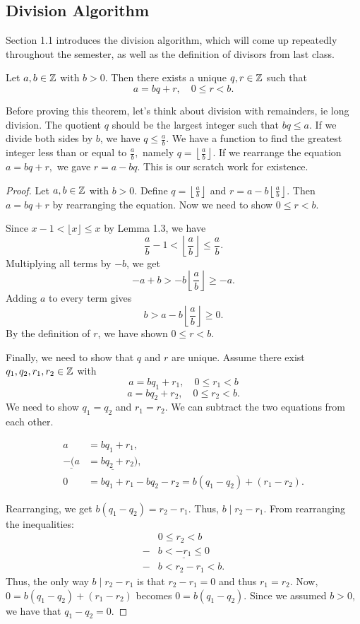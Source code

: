 \documentclass{ximera}
\begin{document}
\subsection{Division Algorithm}
Section 1.1 introduces the division algorithm, which will come up repeatedly throughout the semester, as well as the definition of divisors from last class.

\begin{thm}\label{division-alg}
 Let $a,b\in\mathbb Z$ with $b>0$. Then there exists a unique $q,r\in\mathbb Z$ such that \[a=bq+r, \quad 0\leq r <b.\]
\end{thm}

Before proving this theorem, let's think about division with remainders, ie long division. The quotient $q$ should be the largest integer such that $bq\leq a$. If we divide both sides by $b$, we have $q\leq\frac{a}{b}$. We have a function to find the greatest integer less than or equal to $\frac{a}{b},$ namely $q=\left\lfloor\frac{a}{b}\right\rfloor$. If we rearrange the equation $a=bq+r,$ we gave $r=a-bq$. This is our scratch work for existence.

\begin{proof} Let $a,b\in\mathbb Z$ with $b>0$.
Define $q=\left\lfloor\frac{a}{b}\right\rfloor$ and $r=a-b\left\lfloor\frac{a}{b}\right\rfloor$. Then $a=bq+r$ by rearranging the equation. 
Now we need to show $0\leq r<b$. 

Since $x-1<\lfloor x\rfloor\leq x$ by Lemma 1.3, we have \[\frac{a}{b}-1<\left\lfloor\frac{a}{b}\right\rfloor\leq\frac{a}{b}.\] 
Multiplying all terms by $-b$, we get 
 \[-a+b>-b\left\lfloor\frac{a}{b}\right\rfloor\geq-a.\]
 Adding $a$ to every term gives \[b>a-b\left\lfloor\frac{a}{b}\right\rfloor\geq 0.\] 
By the definition of $r$, we have shown $0\leq r <b$.

Finally, we need to show that $q$ and $r$ are unique.
Assume there exist $q_1,q_2,r_1,r_2\in\mathbb Z$ with \[a=bq_1+r_1, \quad 0\leq r_1<b\]
 \[a=bq_2+r_2, \quad 0\leq r_2<b.\]
 We need to show $q_1=q_2$ and $r_1=r_2$. We can subtract the two equations from each other. 
 
\begin{align*}
  a&=bq_1+r_1, \\
\underline{ -(a}&\underline{=bq_2+r_2)}, \\
 0&=bq_1+r_1-bq_2-r_2=b(q_1-q_2)+(r_1-r_2) . 
\end{align*}

Rearranging, we get $b(q_1-q_2)=r_2-r_1$. Thus, $b\mid r_2-r_1$. From rearranging the inequalities:
\begin{align*}
 & 0\leq r_2<b\\
- & \underline{b< -r_1\leq 0}\\
 -&b<r_2-r_1<b.
\end{align*}
Thus, the only way $b\mid r_2-r_1$ is that $r_2-r_1=0$ and thus $r_1=r_2$. Now, $0=b(q_1-q_2)+(r_1-r_2)$ becomes $0=b(q_1-q_2)$. Since we assumed $b>0$, we have that $q_1-q_2=0$. 
\end{proof}
\end{document}
